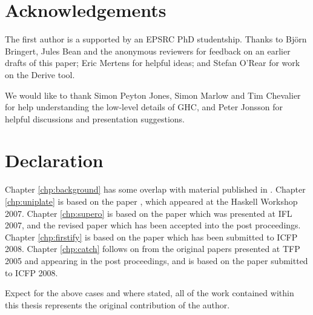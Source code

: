 \tableofcontents
\listoffigures
\listoftables

\chapter*{Acknowledgements}


The first author is a supported by an EPSRC PhD studentship. Thanks to Bj\"{o}rn Bringert, Jules Bean and the anonymous reviewers for feedback on an earlier drafts of this paper; Eric Mertens for helpful ideas; and Stefan O'Rear for work on the Derive tool.

We would like to thank Simon Peyton Jones, Simon Marlow and Tim Chevalier for help understanding the low-level details of GHC, and Peter Jonsson for helpful discussions and presentation suggestions.


\chapter*{Declaration}

Chapter \ref{chp:background} has some overlap with material published in \cite{me:yhc_core}. Chapter \ref{chp:uniplate} is based on the paper \cite{me:uniplate}, which appeared at the Haskell Workshop 2007. Chapter \ref{chp:supero} is based on the paper \cite{me:supero_ifl} which was presented at IFL 2007, and the revised paper \cite{me:supero} which has been accepted into the post proceedings. Chapter \ref{chp:firstify} is based on the paper \cite{me:firstify_icfp} which has been submitted to ICFP 2008. Chapter \ref{chp:catch} follows on from the original papers \cite{me:catch_tfp_original,me:catch_tfp} presented at TFP 2005 and appearing in the post proceedings, and is based on the paper \cite{me:catch_icfp} submitted to ICFP 2008.

Expect for the above cases and where stated, all of the work contained within this thesis represents the original contribution of the author.
